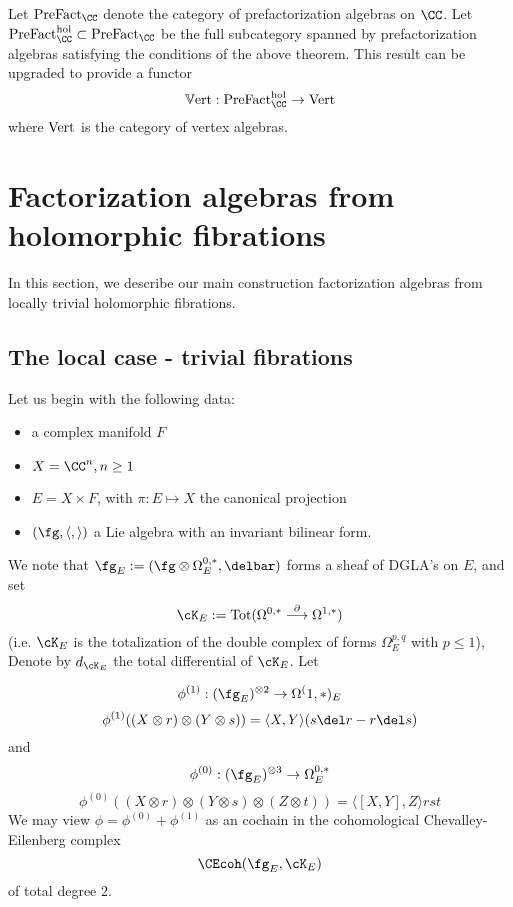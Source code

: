 \documentclass[12pt]{amsart}
\theoremstyle{definition}
\theoremstyle{remark}
\newcommand{\on}{\operatorname}
\begin{document}
Let ${\rm PreFact}_\CC$ denote the category of prefactorization
algebras on $\CC$. Let ${\rm PreFact}^{\rm hol}_\CC \subset {\rm
  PreFact}_\CC$ be the full subcategory spanned by prefactorization
algebras satisfying the conditions of the above theorem. This result
can be upgraded to provide a functor
\[
\mathbb{V}{\rm ert} : {\rm PreFact}^{\rm hol}_\CC \to {\rm Vert}
\]
where ${\rm Vert}$ is the category of vertex algebras. 

\section{Factorization algebras from holomorphic fibrations}

In this section, we describe our main construction factorization algebras from locally trivial holomorphic fibrations. 

\subsection{The local case - trivial fibrations}

Let us begin with the following data:
\begin{itemize}
\item a complex manifold $F$
\item $X = \CC^n, n \geq 1$
\item $E = X \times F$, with $\pi: E \mapsto X $ the canonical projection
\item $(\fg, \langle, \rangle)$ a Lie algebra with an invariant bilinear form.
\end{itemize}

We note that $\fg_E := (\fg \otimes \Omega^{0,*}_E, \delbar)$ forms a sheaf of DGLA's on $E$, and
set
\[
\cK_E := \on{Tot} ( \Omega^{0,*} \overset{\partial}{\longrightarrow} \Omega^{1,*})
\]
(i.e. $\cK_E$ is the totalization of the double complex of forms $\Omega^{p,q}_E$ with $p \leq 1$), Denote by $d_{\cK_E}$ the total differential of $\cK_E$. 
Let 

$$ \phi^{(1)}: (\fg_{E})^{\otimes 2} \rightarrow \Omega^(1,*)_{E} $$
$$ \phi^{(1)} ((X \otimes r) \otimes (Y \otimes s)) = \langle X, Y \rangle (s \del r - r \del s) $$
and 
$$ \phi^{(0)}: (\fg_{E})^{\otimes 3} \rightarrow \Omega^{0,*}_E $$
$$ \phi^{(0)}( (X \otimes r)\otimes(Y \otimes s) \otimes (Z \otimes t)) = \langle [X,Y], Z \rangle rst $$
We may view $\phi = \phi^{(0)} + \phi^{(1)}$ as an cochain in the cohomological Chevalley-Eilenberg complex $$ \CEcoh(\fg_{E}, \cK_{E}) $$ of total degree $2$.
\end{document}
